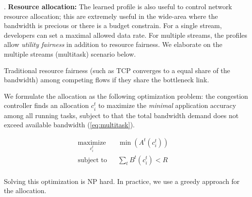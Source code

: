 %     

\vspace{1em}\noindent {}. \textbf{Resource allocation:}
The learned profile is also useful to control network resource allocation; this
are extremely useful in the wide-area where the bandwidth is precious or there
is a budget constrain. For a single stream, developers can set a maximal allowed
data rate. For multiple streams, the profiles allow \textit{utility fairness} in
addition to resource fairness. We elaborate on the multiple streams (multitask)
scenario below.

Traditional resource fairness (such as TCP converges to a equal share of the
bandwidth) among competing flows if they share the bottleneck link.


We formulate the allocation as the following optimization problem: the
congestion controller finds an allocation $c_i^t$ to maximize the
\textit{minimal} application accuracy among all running tasks, subject to that
the total bandwidth demand does not exceed available bandwidth
(\autoref{eq:multitask}).

\begin{equation}
  \label{eq:multitask}
  \begin{aligned}
    & \underset{c_i^t}{\text{maximize}} & & \min({A^t(c_i^t)}) & & \\
    & \text{subject to} & & \sum_t{B^t(c_i^t)} < R & & \\
  \end{aligned}
\end{equation}

Solving this optimization is NP hard. In practice, we use a greedy approach for
the allocation.

